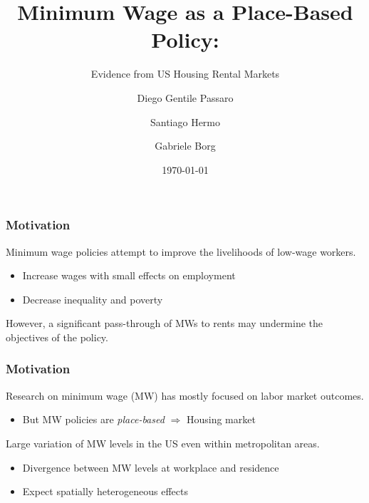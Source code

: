 \documentclass[aspectratio=169, t]{beamer}
\title{Minimum Wage as a Place-Based Policy:}
\subtitle{Evidence from US Housing Rental Markets}
\date{\today}
\author{Diego Gentile Passaro \and Santiago Hermo \and Gabriele Borg}
\institute{Brown University $ \quad\quad\quad\quad $ Brown University $ \quad\quad\quad\quad$  AWS}
\begin{document}
\maketitle



\begin{frame}
    \frametitle{Motivation}
    
    Minimum wage policies attempt to improve the livelihoods of low-wage workers.
    \begin{itemize}
        \item Increase wages with small effects on employment
        {\small \color{gray} \parencite[e.g.,][]{CegnizEtAl2019}}
        \item Decrease inequality {\small \color{gray} \parencite{AutorEtAl2016}}
        and poverty {\small \color{gray} \parencite{Dube2019Income}}
    \end{itemize}

    \vspace{2mm}
    \pause
    However, %
    a significant pass-through of MWs to rents may undermine the objectives of the policy.
    

\end{frame}

\begin{frame}
    \frametitle{Motivation}
    
    Research on minimum wage (MW) has mostly focused on labor market outcomes.
    
    \begin{itemize}
        \item But MW policies are \textit{place-based} $\Rightarrow$ Housing market
    \end{itemize}

    \pause
    \vspace{3mm}
    Large variation of MW levels in the US even within metropolitan areas.
    
    \begin{itemize}
        \item Divergence between MW levels at workplace and residence
        \item Expect spatially heterogeneous effects
    \end{itemize}
\end{frame}
\end{document}
